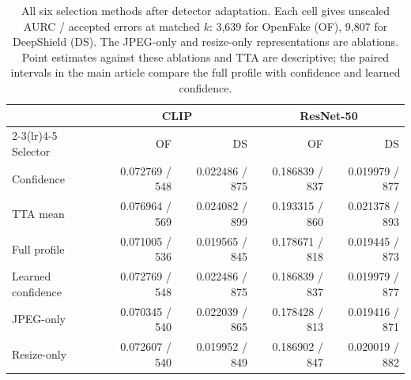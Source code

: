 \begin{table}[t]
\caption{All six selection methods after detector adaptation. Each cell gives unscaled AURC / accepted errors at matched $k$: 3,639 for OpenFake (OF), 9,807 for DeepShield (DS). The JPEG-only and resize-only representations are ablations. Point estimates against these ablations and TTA are descriptive; the paired intervals in the main article compare the full profile with confidence and learned confidence.}
\label{tab:adapted_all_methods}
\centering\small
\begin{tabular}{lrrrr}
\toprule
 & \multicolumn{2}{c}{CLIP} & \multicolumn{2}{c}{ResNet-50} \\
\cmidrule(lr){2-3}\cmidrule(lr){4-5}
Selector & OF & DS & OF & DS \\
\midrule
Confidence & 0.072769 / 548 & 0.022486 / 875 & 0.186839 / 837 & 0.019979 / 877 \\
TTA mean & 0.076964 / 569 & 0.024082 / 899 & 0.193315 / 860 & 0.021378 / 893 \\
Full profile & 0.071005 / 536 & 0.019565 / 845 & 0.178671 / 818 & 0.019445 / 873 \\
Learned confidence & 0.072769 / 548 & 0.022486 / 875 & 0.186839 / 837 & 0.019979 / 877 \\
JPEG-only & 0.070345 / 540 & 0.022039 / 865 & 0.178428 / 813 & 0.019416 / 871 \\
Resize-only & 0.072607 / 540 & 0.019952 / 849 & 0.186902 / 847 & 0.020019 / 882 \\
\bottomrule
\end{tabular}
\end{table}
